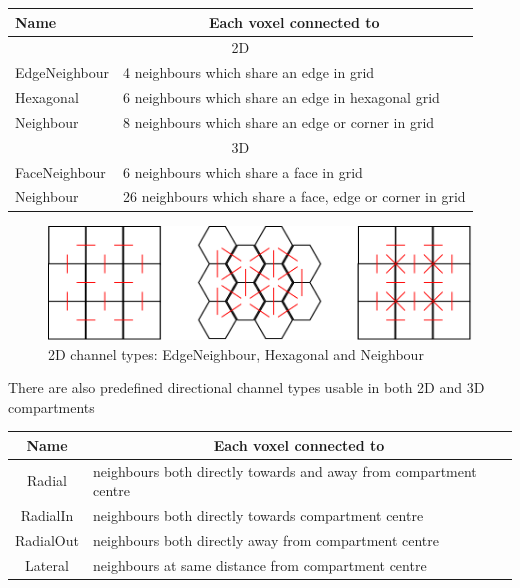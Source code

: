 \documentclass[english]{report}
\begin{document}
\medskip 
\begin{table}[h!]
\centering
{}
\begin{tabular}{|l|l|}
\hline
Name & \multicolumn{1}{|c|}{Each voxel connected to}\\ 
\hline
\multicolumn{2}{|c|}{2D}\\
\hline
EdgeNeighbour & 4 neighbours which share an edge in grid \\
Hexagonal & 6 neighbours which share an edge in hexagonal grid \\
Neighbour & 8 neighbours which share an edge or corner in grid \\
\hline
\multicolumn{2}{|c|}{3D}\\
\hline
FaceNeighbour & 6 neighbours which share a face in grid\\
Neighbour & 26 neighbours which share a face, edge or corner in grid \\
\hline
\end{tabular} 

\end{table}


\medskip 

\begin{figure}[h!]
 \centering
 \includegraphics[scale=0.31]{./images/channelTypes.png}
 \caption{2D channel types: EdgeNeighbour, Hexagonal and Neighbour}
 \label{fig:channelTypes}
\end{figure}

There are also predefined directional channel types usable in both 2D and 3D compartments

\medskip

\begin{tabular}{|c|l|}
\hline
Name & \multicolumn{1}{|c|}{Each voxel connected to}\\ 
\hline
Radial & neighbours both directly towards and away from compartment centre  \\
RadialIn & neighbours both directly towards compartment centre \\
RadialOut & neighbours both directly away from compartment centre \\
Lateral & neighbours at same distance from compartment centre \\
\hline
\end{tabular} 
\end{document}
